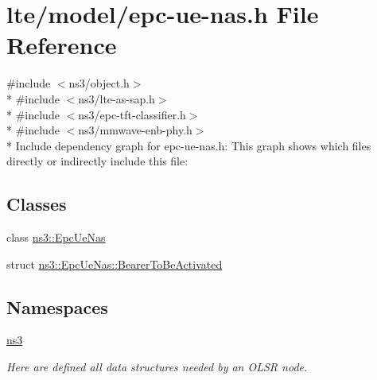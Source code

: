 \hypertarget{epc-ue-nas_8h}{}\section{lte/model/epc-\/ue-\/nas.h File Reference}
\label{epc-ue-nas_8h}
{\ttfamily \#include $<$ns3/object.\+h$>$}\\*
{\ttfamily \#include $<$ns3/lte-\/as-\/sap.\+h$>$}\\*
{\ttfamily \#include $<$ns3/epc-\/tft-\/classifier.\+h$>$}\\*
{\ttfamily \#include $<$ns3/mmwave-\/enb-\/phy.\+h$>$}\\*
Include dependency graph for epc-\/ue-\/nas.h\+:
This graph shows which files directly or indirectly include this file\+:
\subsection*{Classes}
\begin{DoxyCompactItemize}
\item 
class \hyperlink{classns3_1_1EpcUeNas}{ns3\+::\+Epc\+Ue\+Nas}
\item 
struct \hyperlink{structns3_1_1EpcUeNas_1_1BearerToBeActivated}{ns3\+::\+Epc\+Ue\+Nas\+::\+Bearer\+To\+Be\+Activated}
\end{DoxyCompactItemize}
\subsection*{Namespaces}
\begin{DoxyCompactItemize}
\item 
 \hyperlink{namespacens3}{ns3}
\begin{DoxyCompactList}\small\item\em Here are defined all data structures needed by an O\+L\+SR node. \end{DoxyCompactList}\end{DoxyCompactItemize}
